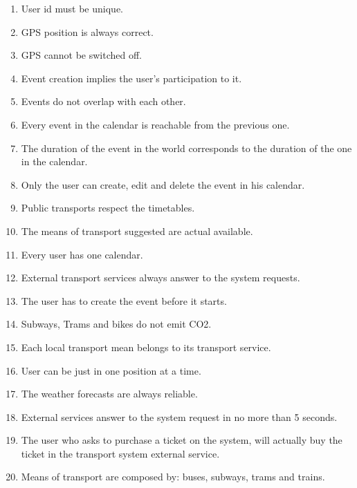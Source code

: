 \begin{enumerate}
	\setlength{\leftskip}{1cm}
	\item User id must be unique.
	\item GPS position is always correct.
	\item GPS cannot be switched off.
	\item Event creation implies the user’s participation to it.
	\item Events do not overlap with each other.
	\item Every event in the calendar is reachable from the previous one.
	\item The duration of the event in the world corresponds to the duration of the one in the calendar.
	\item Only the user can create, edit and delete the event in his calendar.
	\item Public transports respect the timetables.
	\item The means of transport suggested are actual available.
	\item Every user has one calendar.
	\item External transport services always answer to the system requests.
	\item The user has to create the event before it starts.
	\item Subways, Trams and bikes do not emit CO2.
	\item Each local transport mean belongs to its transport service.
	\item User can be just in one position at a time.
	\item The weather forecasts are always reliable.
	\item External services answer to the system request in no more than 5 seconds.
	\item The user who asks to purchase a ticket on the system, will actually buy the ticket in the  transport system external service.
	\item Means of transport are composed by: buses, subways, trams and trains.
\end{enumerate}